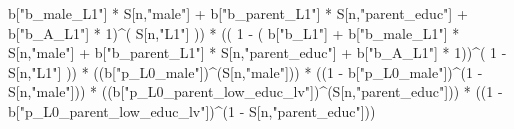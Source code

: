 \documentclass[
]{book}
\newenvironment{Shaded}{\begin{snugshade}}{\end{snugshade}}
\newcommand{\DecValTok}[1]{\textcolor[rgb]{0.00,0.00,0.81}{#1}}
\newcommand{\NormalTok}[1]{#1}
\newcommand{\SpecialCharTok}[1]{\textcolor[rgb]{0.00,0.00,0.00}{#1}}
\newcommand{\StringTok}[1]{\textcolor[rgb]{0.31,0.60,0.02}{#1}}
\begin{document}
\begin{Shaded}
\begin{Highlighting}[]
\NormalTok{           b[}\StringTok{"b\_male\_L1"}\NormalTok{] }\SpecialCharTok{*}\NormalTok{ S[n,}\StringTok{"male"}\NormalTok{] }\SpecialCharTok{+}  
\NormalTok{           b[}\StringTok{"b\_parent\_L1"}\NormalTok{] }\SpecialCharTok{*}\NormalTok{ S[n,}\StringTok{"parent\_educ"}\NormalTok{] }\SpecialCharTok{+}
\NormalTok{           b[}\StringTok{"b\_A\_L1"}\NormalTok{] }\SpecialCharTok{*} \DecValTok{1}\NormalTok{)}\SpecialCharTok{\^{}}\NormalTok{( S[n,}\StringTok{"L1"}\NormalTok{] )) }\SpecialCharTok{*}
\NormalTok{      (( }\DecValTok{1} \SpecialCharTok{{-}}\NormalTok{ ( b[}\StringTok{"b\_L1"}\NormalTok{] }\SpecialCharTok{+}
\NormalTok{                 b[}\StringTok{"b\_male\_L1"}\NormalTok{] }\SpecialCharTok{*}\NormalTok{ S[n,}\StringTok{"male"}\NormalTok{] }\SpecialCharTok{+}  
\NormalTok{                 b[}\StringTok{"b\_parent\_L1"}\NormalTok{] }\SpecialCharTok{*}\NormalTok{ S[n,}\StringTok{"parent\_educ"}\NormalTok{] }\SpecialCharTok{+}
\NormalTok{                 b[}\StringTok{"b\_A\_L1"}\NormalTok{] }\SpecialCharTok{*} \DecValTok{1}\NormalTok{))}\SpecialCharTok{\^{}}\NormalTok{( }\DecValTok{1} \SpecialCharTok{{-}}\NormalTok{ S[n,}\StringTok{"L1"}\NormalTok{] )) }\SpecialCharTok{*}
\NormalTok{      ((b[}\StringTok{"p\_L0\_male"}\NormalTok{])}\SpecialCharTok{\^{}}\NormalTok{(S[n,}\StringTok{"male"}\NormalTok{])) }\SpecialCharTok{*} 
\NormalTok{      ((}\DecValTok{1} \SpecialCharTok{{-}}\NormalTok{ b[}\StringTok{"p\_L0\_male"}\NormalTok{])}\SpecialCharTok{\^{}}\NormalTok{(}\DecValTok{1} \SpecialCharTok{{-}}\NormalTok{ S[n,}\StringTok{"male"}\NormalTok{])) }\SpecialCharTok{*} 
\NormalTok{      ((b[}\StringTok{"p\_L0\_parent\_low\_educ\_lv"}\NormalTok{])}\SpecialCharTok{\^{}}\NormalTok{(S[n,}\StringTok{"parent\_educ"}\NormalTok{])) }\SpecialCharTok{*}
\NormalTok{      ((}\DecValTok{1} \SpecialCharTok{{-}}\NormalTok{ b[}\StringTok{"p\_L0\_parent\_low\_educ\_lv"}\NormalTok{])}\SpecialCharTok{\^{}}\NormalTok{(}\DecValTok{1} \SpecialCharTok{{-}}\NormalTok{ S[n,}\StringTok{"parent\_educ"}\NormalTok{])) }
    

\end{Highlighting}
\end{Shaded}
\end{document}

